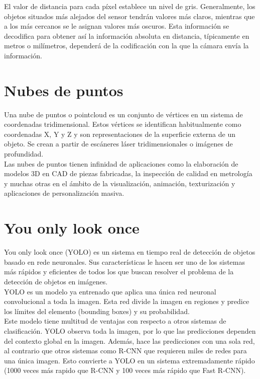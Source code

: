 
El valor de distancia para cada píxel establece un nivel de gris. Generalmente, los objetos situados más alejados del sensor tendrán valores más claros, mientras que a los más cercanos se le asignan valores más oscuros. Esta información se decodifica para obtener así la información absoluta en distancia, típicamente en metros o milímetros, dependerá de la codificación con la que la cámara envía la información.\\

\section{Nubes de puntos}

Una nube de puntos o pointcloud es un conjunto de vértices en un sistema de coordenadas tridimensional. Estos vértices se identifican habitualmente como coordenadas X, Y y Z y son representaciones de la superficie externa de un objeto. Se crean a partir de escáneres láser tridimensionales o imágenes de profundidad.\\

Las nubes de puntos tienen infinidad de aplicaciones como la elaboración de modelos 3D en CAD de piezas fabricadas, la inspección de calidad en metrología y muchas otras en el ámbito de la visualización, animación, texturización y aplicaciones de personalización masiva.\\


\section{You only look once}

You only look once (YOLO) es un sistema en tiempo real de detección de objetos basado en rede neuronales. Sus características le hacen ser uno de los sistemas más rápidos y eficientes de todos los que buscan resolver el problema de la detección de objetos en imágenes.\\

YOLO es un modelo ya entrenado que aplica una única red neuronal convolucional a toda la imagen. Esta red divide la imagen en regiones y predice los límites del elemento (bounding boxes) y su probabilidad.\\

Este modelo tiene multitud de ventajas con respecto a  otros sistemas de clasificación. YOLO observa toda la imagen, por lo que las predicciones dependen del contexto global en la imagen. Además, hace las predicciones con una sola red, al contrario que otros sistemas como R-CNN que requieren miles de redes para una única imagen. Esto convierte a YOLO en un sistema extremadamente rápido (1000 veces más rapido que R-CNN y 100 veces más rápido que Fast R-CNN).\\

